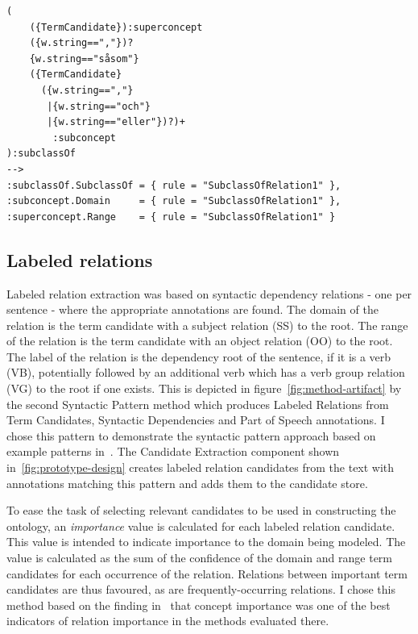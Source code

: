 \documentclass[a4paper]{report}
\begin{document}
\begin{Code}
\begin{lstlisting}[frame=single]
(
	({TermCandidate}):superconcept
	({w.string==","})?
	{w.string=="såsom"}
	({TermCandidate}
	  ({w.string==","}
	   |{w.string=="och"}
	   |{w.string=="eller"})?)+
	    :subconcept
):subclassOf
-->
:subclassOf.SubclassOf = { rule = "SubclassOfRelation1" },
:subconcept.Domain     = { rule = "SubclassOfRelation1" },
:superconcept.Range    = { rule = "SubclassOfRelation1" }
\end{lstlisting}
\end{Code}

\subsection{Labeled relations}

Labeled relation extraction was based on syntactic dependency relations - one per sentence - where the appropriate annotations are found.
The domain of the relation is the term candidate with a subject relation (SS) to the root.
The range of the relation is the term candidate with an object relation (OO) to the root.
The label of the relation is the dependency root of the sentence, if it is a verb (VB), potentially followed by an additional verb which has a verb group relation (VG) to the root if one exists.
This is depicted in figure~\ref{fig:method-artifact} by the second Syntactic Pattern method which produces Labeled Relations from Term Candidates, Syntactic Dependencies and Part of Speech annotations.
I chose this pattern to demonstrate the syntactic pattern approach based on example patterns in~\cite{Zouaq11OntoCmaps}.
The Candidate Extraction component shown in~\ref{fig:prototype-design} creates labeled relation candidates from the text with annotations matching this pattern and adds them to the candidate store.

To ease the task of selecting relevant candidates to be used in constructing the ontology, an \emph{importance} value is calculated for each labeled relation candidate.
This value is intended to indicate importance to the domain being modeled.
The value is calculated as the sum of the confidence of the domain and range term candidates for each occurrence of the relation.
Relations between important term candidates are thus favoured, as are frequently-occurring relations.
I chose this method based on the finding in~\cite{Zouaq11OntoCmaps} that concept importance was one of the best indicators of relation importance in the methods evaluated there.
\end{document}
